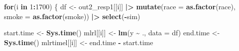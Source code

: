 \documentclass[12pt, twoside]{amherstthesis}
\newenvironment{Shaded}{\begin{snugshade}}{\end{snugshade}}
\newcommand{\AttributeTok}[1]{\textcolor[rgb]{0.13,0.29,0.53}{#1}}
\newcommand{\ControlFlowTok}[1]{\textcolor[rgb]{0.13,0.29,0.53}{\textbf{#1}}}
\newcommand{\DecValTok}[1]{\textcolor[rgb]{0.00,0.00,0.81}{#1}}
\newcommand{\FunctionTok}[1]{\textcolor[rgb]{0.13,0.29,0.53}{\textbf{#1}}}
\newcommand{\NormalTok}[1]{#1}
\newcommand{\OtherTok}[1]{\textcolor[rgb]{0.56,0.35,0.01}{#1}}
\newcommand{\SpecialCharTok}[1]{\textcolor[rgb]{0.81,0.36,0.00}{\textbf{#1}}}
\begin{document}
\begin{Shaded}
\begin{Highlighting}[]
  \ControlFlowTok{for}\NormalTok{(i }\ControlFlowTok{in} \DecValTok{1}\SpecialCharTok{:}\DecValTok{1700}\NormalTok{) \{}
\NormalTok{    df }\OtherTok{\textless{}{-}}\NormalTok{ out2\_resp1[[i]] }\SpecialCharTok{|\textgreater{}} 
      \FunctionTok{mutate}\NormalTok{(}\AttributeTok{race =} \FunctionTok{as.factor}\NormalTok{(race), }\AttributeTok{smoke =} \FunctionTok{as.factor}\NormalTok{(smoke)) }\SpecialCharTok{|\textgreater{}} 
      \FunctionTok{select}\NormalTok{(}\SpecialCharTok{{-}}\NormalTok{sim)}
    
\NormalTok{    start.time }\OtherTok{\textless{}{-}} \FunctionTok{Sys.time}\NormalTok{()}
\NormalTok{    mlrl[[i]] }\OtherTok{\textless{}{-}} \FunctionTok{lm}\NormalTok{(y }\SpecialCharTok{\textasciitilde{}}\NormalTok{ ., }\AttributeTok{data =}\NormalTok{ df)}
\NormalTok{    end.time }\OtherTok{\textless{}{-}} \FunctionTok{Sys.time}\NormalTok{()}
\NormalTok{    mlrtimel[[i]] }\OtherTok{\textless{}{-}}\NormalTok{ end.time }\SpecialCharTok{{-}}\NormalTok{ start.time}
    

\end{Highlighting}
\end{Shaded}
\end{document}
